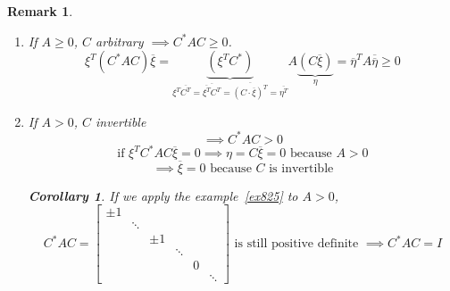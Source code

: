 \documentclass{article}
\newtheorem{remark}{Remark}  \numberwithin{remark}{section}
\newtheorem{corollary}{Corollary}  \numberwithin{corollary}{section}
\begin{document}
\begin{remark} %
  \begin{enumerate}
    \item If $A \geq 0$, $C$ arbitrary $\implies C^* AC \geq 0$.
      \[ \xi^T (C^* AC) \overline{\xi} = \underbrace{(\xi^T C^*)}_{\xi^T \overline{C^T} = \overline{\overline{\xi^T} C^T} = \overline{(C \cdot \overline{\xi})^T} = \overline{\eta^T}} A \underbrace{(C \overline{\xi})}_{\eta}
         = \overline{\eta}^T A \overline{\overline{\eta}} \geq 0
      \]
    \item If $A > 0$, $C$ invertible
      \[ \implies C^* AC > 0 \]
      \[ \text{if } \xi^T C^* AC \overline{\xi} = 0 \implies  \eta = C \overline{\xi} = 0 \text{ because } A > 0 \]
      \[ \implies \overline{\xi} = 0 \text{ because } C \text{ is invertible} \]

      \begin{corollary}
        If we apply the example~\ref{ex825} to $A>0$,
        \[
          C^* AC = \begin{bmatrix}
            \pm 1 &        &       &        &   & \\
                  & \ddots &       &        &   & \\
                  &        & \pm 1 &        &   & \\
                  &        &       & \ddots &   & \\
                  &        &       &        & 0 & \\
                  &        &       &        &   & \ddots
          \end{bmatrix}
          \text{ is still positive definite }
          \implies C^* AC = I
        \]
      \end{corollary}
  \end{enumerate}
\end{remark}
\end{document}
